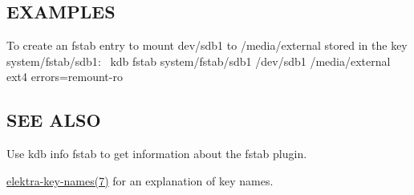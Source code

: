 \subsection*{E\+X\+A\+M\+P\+L\+ES}

To create an fstab entry to mount {\ttfamily dev/sdb1} to {\ttfamily /media/external} stored in the key {\ttfamily system/fstab/sdb1}\+:~\newline
 {\ttfamily kdb fstab system/fstab/sdb1 /dev/sdb1 /media/external ext4 errors=remount-\/ro}

\subsection*{S\+EE A\+L\+SO}


\begin{DoxyItemize}
\item Use {\ttfamily kdb info fstab} to get information about the fstab plugin.
\item \hyperlink{doc_help_elektra-key-names_md}{elektra-\/key-\/names(7)} for an explanation of key names. 
\end{DoxyItemize}